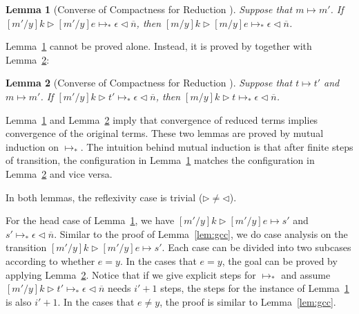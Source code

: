 \documentclass{article}
\newtheorem{lemma}{Lemma}
\newcommand{\RNum}[1]{\uppercase\expandafter{\romannumeral #1\relax}}
\begin{document}
\begin{lemma}[Converse of Compactness for Reduction \RNum{1}]\label{lem:B}
  Suppose that $m\longmapsto m'$.
  If $[m'/y]k\triangleright[m'/y]e\longmapsto_* \epsilon\triangleleft\overline{n}$,
  then $[m/y]k\triangleright[m/y]e\longmapsto_* \epsilon\triangleleft\overline{n}$.
\end{lemma}


Lemma~\ref{lem:B} cannot be proved alone. Instead, it is proved by together with Lemma~\ref{lem:C}:


\begin{lemma}[Converse of Compactness for Reduction \RNum{2}]\label{lem:C}
  Suppose that $t\longmapsto t'$ and $m\longmapsto m'$.
  If $[m'/y]k\triangleright t'\longmapsto_* \epsilon\triangleleft\overline{n}$,
  then $[m/y]k\triangleright t\longmapsto_* \epsilon\triangleleft\overline{n}$.
\end{lemma}

Lemma~\ref{lem:B} and Lemma~\ref{lem:C} imply that
convergence of reduced terms implies convergence of the original terms.
These two lemmas are  proved by mutual induction on $\longmapsto_*$.
The intuition behind mutual induction is that after finite steps of transition,
the configuration in Lemma~\ref{lem:B} matches the configuration in Lemma~\ref{lem:C}
and vice versa.

In both lemmas, the reflexivity case is trivial ($\triangleright\neq \triangleleft$).

For the head case of Lemma~\ref{lem:B},
we have $[m'/y]k\triangleright[m'/y]e\longmapsto s'$
and $s' \longmapsto_* \epsilon\triangleleft\overline{n}$.
Similar to the proof of Lemma~\ref{lem:gcc}, we do case analysis on
the transition $[m'/y]k\triangleright[m'/y]e\longmapsto s'$.
Each case can be divided into two subcases according to whether $e = y$.
In the cases that $e = y$, the goal can be proved by applying Lemma~\ref{lem:C}.
Notice that if we give explicit steps for $\longmapsto_*$
and assume $[m'/y]k\triangleright t'\longmapsto_* \epsilon\triangleleft\overline{n}$ needs $i' + 1$ steps,
the steps for the instance of Lemma~\ref{lem:B} is also $i' + 1$.
In the cases that $e \neq y$, the proof is similar to Lemma~\ref{lem:gcc}.
\end{document}
